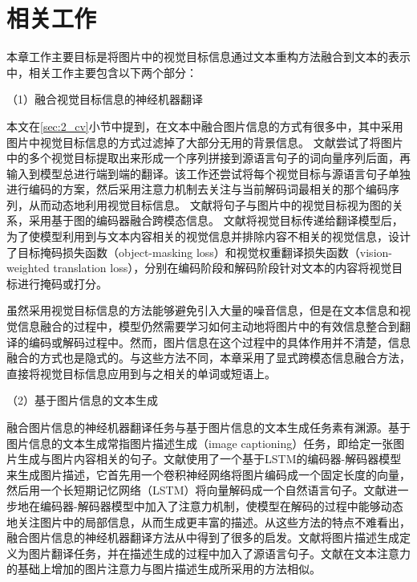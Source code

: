 \section{相关工作}



% 

本章工作主要目标是将图片中的视觉目标信息通过文本重构方法融合到文本的表示中，相关工作主要包含以下两个部分：

{\sffamily （1）融合视觉目标信息的神经机器翻译}

本文在\ref{sec:2_cv}小节中提到，在文本中融合图片信息的方式有很多中，其中采用图片中视觉目标信息的方式过滤掉了大部分无用的背景信息。
文献\cite{35_huang-etal-2016-attention}尝试了将图片中的多个视觉目标提取出来形成一个序列拼接到源语言句子的词向量序列后面，再输入到模型总进行端到端的翻译。该工作还尝试将每个视觉目标与源语言句子单独进行编码的方案，然后采用注意力机制去关注与当前解码词最相关的那个编码序列，从而动态地利用视觉目标信息。
文献\cite{33_yin-etal-2020-novel}将句子与图片中的视觉目标视为图的关系，采用基于图的编码器融合跨模态信息。
文献\cite{48_DBLP:conf/aaai/WangX21}将视觉目标传递给翻译模型后，为了使模型利用到与文本内容相关的视觉信息并排除内容不相关的视觉信息，设计了目标掩码损失函数（object-masking loss）和视觉权重翻译损失函数（vision-weighted translation loss），分别在编码阶段和解码阶段针对文本的内容将视觉目标进行掩码或打分。

虽然采用视觉目标信息的方法能够避免引入大量的噪音信息，但是在文本信息和视觉信息融合的过程中，模型仍然需要学习如何主动地将图片中的有效信息整合到翻译的编码或解码过程中。然而，图片信息在这个过程中的具体作用并不清楚，信息融合的方式也是隐式的。与这些方法不同，本章采用了显式跨模态信息融合方法，直接将视觉目标信息应用到与之相关的单词或短语上。

{\sffamily （2）基于图片信息的文本生成}

融合图片信息的神经机器翻译任务与基于图片信息的文本生成任务素有渊源。基于图片信息的文本生成常指图片描述生成（image captioning）任务，即给定一张图片生成与图片内容相关的句子。文献\cite{66_DBLP:conf/cvpr/VinyalsTBE15}使用了一个基于LSTM的编码器-解码器模型来生成图片描述，它首先用一个卷积神经网络将图片编码成一个固定长度的向量，然后用一个长短期记忆网络（LSTM）将向量解码成一个自然语言句子。文献\cite{67_DBLP:conf/icml/XuBKCCSZB15,69_DBLP:conf/cvpr/LuXPS17}进一步地在编码器-解码器模型中加入了注意力机制，使模型在解码的过程中能够动态地关注图片中的局部信息，从而生成更丰富的描述。从这些方法的特点不难看出，融合图片信息的神经机器翻译方法从中得到了很多的启发。文献\cite{68_DBLP:journals/corr/KirosSZ14}将图片描述生成定义为图片翻译任务，并在描述生成的过程中加入了源语言句子。文献\cite{36_calixto-etal-2017-doubly}在文本注意力的基础上增加的图片注意力与图片描述生成所采用的方法相似。

